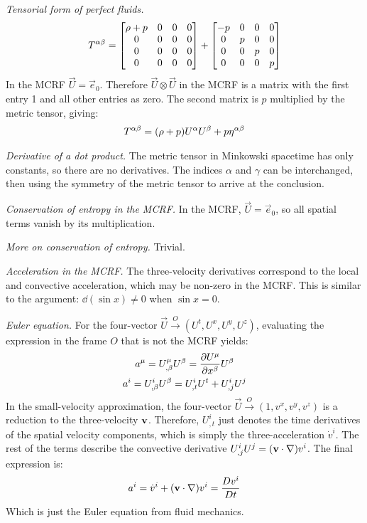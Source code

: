 \documentclass{report}
\begin{document}
\begin{subquests}
	\item \emph{Tensorial form of perfect fluids.}
	\begin{gather*}
		T^{\alpha\beta} = 
		\mqty[
			\rho + p & 0 & 0 & 0 \\
		 	0 & 0 & 0 & 0 \\
		 	0 & 0 & 0 & 0 \\
		 	0 & 0 & 0 & 0
		 	]
		+
		\mqty[
			-p & 0 & 0 & 0 \\
			0 & p & 0 & 0 \\
			0 & 0 & p & 0 \\
			0 & 0 & 0 & p
			]
	\end{gather*}
	In the MCRF $\vec{U} = \vec{e}_0$. Therefore $\vec U \otimes \vec U$ in the MCRF is a matrix with the first entry 1 and all other entries as zero. The second matrix is $p$ multiplied by the metric tensor, giving:
	\begin{gather*}
		T^{\alpha\beta} = \pqty{\rho + p}U^{\alpha}U^{\beta} + p\eta^{\alpha\beta}
	\end{gather*}

	\item \emph{Derivative of a dot product.}
	The metric tensor in Minkowski spacetime has only constants, so there are no derivatives. The indices $\alpha$ and $\gamma$ can be interchanged, then using the symmetry of the metric tensor to arrive at the conclusion.

	\item \emph{Conservation of entropy in the MCRF.}
	In the MCRF, $\vec{U} = \vec{e}_0$, so all spatial terms vanish by its multiplication.

	\item \emph{More on conservation of entropy.}
	Trivial.

	\item \emph{Acceleration in the MCRF.}
	The three-velocity derivatives correspond to the local and convective acceleration, which may be non-zero in the MCRF. This is similar to the argument: $\dd(\sin x) \neq 0$ when $\sin x = 0$.

	\item \emph{Euler equation.}
	For the four-vector $\vec U \stackrel{O}\longrightarrow (U^t, U^x, U^y, U^z)$, evaluating the expression in the frame $O$ that is not the MCRF yields:
	\begin{gather*}
		a^{\mu} = U^{\mu}_{,\beta}U^{\beta} = \pdv{U^{\mu}}{x^{\beta}}U^{\beta} \\
		a^{i} = U^{i}_{,\beta}U^{\beta} = U^{i}_{,t}U^t + U^i_{,j}U^{j}
	\end{gather*}
	In the small-velocity approximation, the four-vector $\vec U \stackrel{O}\longrightarrow (1,v^x,v^y,v^z)$ is a reduction to the three-velocity ${\vb v}$. Therefore, $U^i_{,t}$ just denotes the time derivatives of the spatial velocity components, which is simply the three-acceleration $\dot{v}^i$. The rest of the terms describe the convective derivative $U^i_{,j}U^{j} = \pqty{{\vb v \cdot \nabla}}v^i$. The final expression is:
	\begin{gather*}
		a^i = \dot{v}^i + \pqty{{\vb v \cdot \nabla}}v^i = \frac{Dv^i}{Dt}
	\end{gather*}
	Which is just the Euler equation from fluid mechanics.


\end{subquests}
\end{document}
